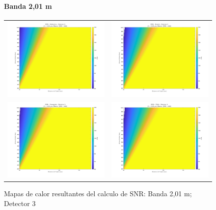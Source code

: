 \begin{landscape}
\begin{figure}[p]
\centering
\setlength{\tabcolsep}{2pt}
\renewcommand{\arraystretch}{0}

\paragraph{Banda 2,01 \textmu m}
\begin{tabular}{cc}
\includegraphics[width=0.48\linewidth]{4.Payload/SNR/SNR_Lambda2_Detector3_Telescopio1_heatmap.jpg} &
\includegraphics[width=0.48\linewidth]{4.Payload/SNR/SNR_Lambda2_Detector3_Telescopio2_heatmap.jpg} \\
\includegraphics[width=0.48\linewidth]{4.Payload/SNR/SNR_Lambda2_Detector3_Telescopio3_heatmap.jpg} &
\includegraphics[width=0.48\linewidth]{4.Payload/SNR/SNR_Lambda2_Detector3_Telescopio4_heatmap.jpg} \\
\end{tabular}
\caption{Mapas de calor resultantes del calculo de SNR: Banda 2,01 \textmu m; Detector 3}
\end{figure}
\end{landscape}
